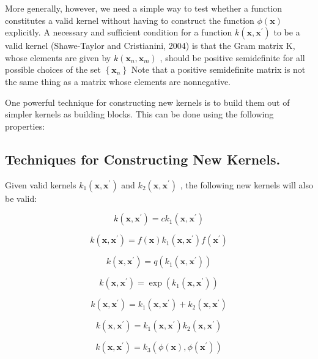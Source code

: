 \documentclass[
  10
]{article}
\begin{document}
More generally, however, we need a simple way to test whether a function
constitutes a valid kernel without having to construct the function
\(\phi ( \mathbf { x } )\) explicitly. A necessary and sufficient
condition for a function
\(k ( \mathbf { x } , \mathbf { x } ^ { \prime } )\) to be a valid
kernel (Shawe-Taylor and Cristianini, 2004) is that the Gram matrix K,
whose elements are given by
\(k ( \mathbf { x } _ { n } , \mathbf { x } _ { m } )\) , should be
positive semidefinite for all possible choices of the set
\(\left\{ \mathbf { x } _ { n } \right\}\) Note that a positive
semidefinite matrix is not the same thing as a matrix whose elements are
nonnegative.

One powerful technique for constructing new kernels is to build them out
of simpler kernels as building blocks. This can be done using the
following properties:

\subsection{Techniques for Constructing New
Kernels.}\label{techniques-for-constructing-new-kernels.}

Given valid kernels
\(k _ { 1 } ( \mathbf { x } , \mathbf { x } ^ { \prime } )\) and
\(k _ { 2 } ( \mathbf { x } , \mathbf { x } ^ { \prime } )\) , the
following new kernels will also be valid:

\[
{k (\mathbf {x}, \mathbf {x} ^ {\prime})} = {c k _ {1} (\mathbf {x}, \mathbf {x} ^ {\prime})}\tag{6.13}
\]

\[
k (\mathbf {x}, \mathbf {x} ^ {\prime}) = f (\mathbf {x}) k _ {1} (\mathbf {x}, \mathbf {x} ^ {\prime}) f (\mathbf {x} ^ {\prime})\tag{6.14}
\]

\[
{k (\mathbf {x}, \mathbf {x} ^ {\prime})} = {q (k _ {1} (\mathbf {x}, \mathbf {x} ^ {\prime}))}\tag{6.15}
\]

\[
k (\mathbf {x}, \mathbf {x} ^ {\prime}) = \exp (k _ {1} (\mathbf {x}, \mathbf {x} ^ {\prime}))\tag{6.16}
\]

\[
k (\mathbf {x}, \mathbf {x} ^ {\prime}) = k _ {1} (\mathbf {x}, \mathbf {x} ^ {\prime}) + k _ {2} (\mathbf {x}, \mathbf {x} ^ {\prime})\tag{6.17}
\]

\[
{k (\mathbf {x}, \mathbf {x} ^ {\prime})} = {k _ {1} (\mathbf {x}, \mathbf {x} ^ {\prime}) k _ {2} (\mathbf {x}, \mathbf {x} ^ {\prime})}\tag{6.18}
\]

\[
{k (\mathbf {x}, \mathbf {x} ^ {\prime})} = {k _ {3} (\phi (\mathbf {x}), \phi (\mathbf {x} ^ {\prime}))}\tag{6.19}
\]
\end{document}
